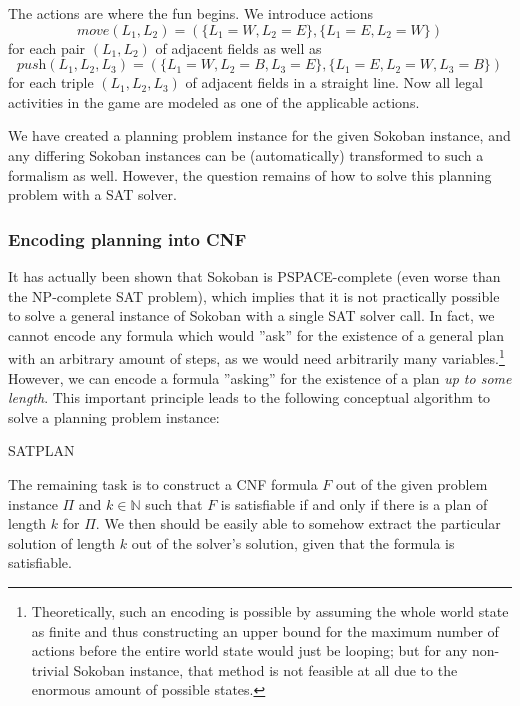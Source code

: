 \documentclass{article}
\theoremstyle{definition}
\begin{document}
The actions are where the fun begins. We introduce actions \[\textit{move}(L_1, L_2) = (\{L_1 = W, L_2 = E\}, \{L_1 = E, L_2 = W\})\] for each pair $(L_1, L_2)$ of adjacent fields as well as \[\textit{push}(L_1, L_2, L_3) = (\{L_1 = W, L_2 = B, L_3 = E\}, \{L_1 = E, L_2 = W, L_3 = B\})\] for each triple $(L_1, L_2, L_3)$ of adjacent fields in a straight line. Now all legal activities in the game are modeled as one of the applicable actions.

We have created a planning problem instance for the given Sokoban instance, and any differing Sokoban instances can be (automatically) transformed to such a formalism as well. However, the question remains of how to solve this planning problem with a SAT solver.

\subsubsection{Encoding planning into CNF}

It has actually been shown that Sokoban is PSPACE-complete (even worse than the NP-complete SAT problem), which implies that it is not practically possible to solve a general instance of Sokoban with a single SAT solver call. In fact, we cannot encode any formula which would ''ask'' for the existence of a general plan with an arbitrary amount of steps, as we would need arbitrarily many variables.\footnote{Theoretically, such an encoding is possible by assuming the whole world state as finite and thus constructing an upper bound for the maximum number of actions before the entire world state would just be looping; but for any non-trivial Sokoban instance, that method is not feasible at all due to the enormous amount of possible states.}
However, we can encode a formula ''asking'' for the existence of a plan \emph{up to some length}. This important principle leads to the following conceptual algorithm to solve a planning problem instance:

\begin{algorithm}
\caption{SATPLAN}
\end{algorithm}

The remaining task is to construct a CNF formula $F$ out of the given problem instance $\Pi$ and $k \in \mathbb{N}$ such that $F$ is satisfiable if and only if there is a plan of length $k$ for $\Pi$. We then should be easily able to somehow extract the particular solution of length $k$ out of the solver's solution, given that the formula is satisfiable.
\end{document}

